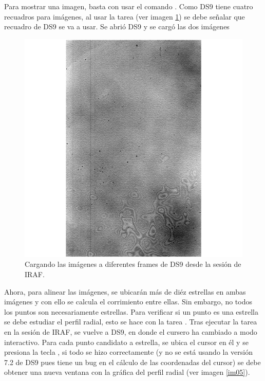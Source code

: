 \documentclass[12pt]{article}
\begin{document}
Para mostrar una imagen, basta con usar el comando . Como DS9 tiene cuatro recuadros para imágenes, al usar la tarea  (ver imagen \ref{im03}) se debe señalar que recuadro de DS9 se va a usar. Se abrió DS9 y se cargó las dos imágenes
\begin{figure}[H]
  \centering
   \includegraphics[scale= 0.65]{im03.png}
  \caption{Cargando las imágenes a diferentes frames de DS9 desde la sesión de IRAF. }
  \label{im03}
\end{figure}




Ahora, para alinear las imágenes, se ubicarán más de diéz estrellas en ambas imágenes y con ello se calcula el corrimiento entre ellas. Sin embargo, no todos los puntos son necesariamente estrellas. Para verificar si un punto es una estrella se debe estudiar el perfil radial, esto se hace con la tarea . Tras ejecutar la tarea en la sesión de IRAF, se vuelve a DS9, en donde el cursero ha cambiado a modo interactivo. Para cada punto candidato a estrella, se ubica el cursor en él y se presiona la tecla , si todo se hizo correctamente (y no se está usando la versión 7.2 de DS9 pues tiene un bug en el cálculo de las coordenadas del cursor) se debe obtener una nueva ventana con la gráfica del perfil radial (ver imagen \ref{im05}). 
\end{document}
